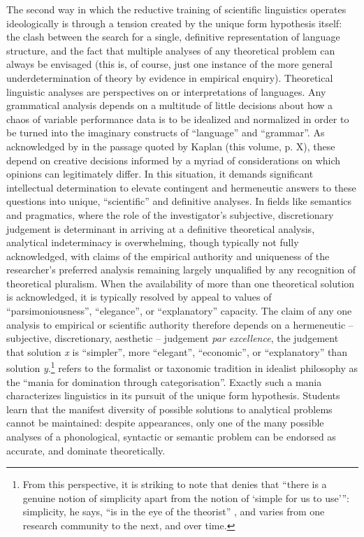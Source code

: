 \documentclass[output=paper]{langscibook}
\begin{document}
The second way in which the reductive training of scientific linguistics operates ideologically is through a tension created by the unique form hypothesis itself: the clash between the search for a single, definitive representation of language structure, and the fact that multiple analyses of any theoretical problem can always be envisaged (this is, of course, just one instance of the more general underdetermination of theory by evidence in empirical enquiry). Theoretical linguistic analyses are perspectives on or interpretations of languages. Any grammatical analysis depends on a multitude of little decisions about how a chaos of variable performance data is to be idealized and normalized in order to be turned into the imaginary constructs of ``language'' and ``grammar''. As acknowledged by \citet[147]{Hockett1958} in the passage quoted by Kaplan (this volume, p. X), these depend on creative decisions informed by a myriad of considerations on which opinions can legitimately differ. In this situation, it demands significant intellectual determination to elevate contingent and hermeneutic answers to these questions into unique, ``scientific'' and definitive analyses. In fields like semantics and pragmatics, where the role of the investigator's subjective, discretionary judgement is determinant in arriving at a definitive theoretical analysis, analytical indeterminacy is overwhelming, though typically not fully acknowledged, with claims of the empirical authority and uniqueness of the researcher's preferred analysis remaining largely unqualified by any recognition of theoretical pluralism. When the availability of more than one theoretical solution is acknowledged, it is typically resolved by appeal to values of ``parsimoniousness'', ``elegance'', or ``explanatory'' capacity. The claim of any one analysis to empirical or scientific authority therefore depends on a hermeneutic – subjective, discretionary, aesthetic – judgement \emph{par excellence}, the judgement that solution \emph{x} is ``simpler'', more ``elegant'', ``economic'', or ``explanatory'' than solution \emph{y}.\footnote{From this perspective, it is striking to note that \citet[159]{Ludlow2011} denies that ``there is a genuine notion of simplicity apart from the notion of `simple for us to use'\thinspace'': simplicity, he says, ``is in the eye of the theorist'' \citep[161]{Ludlow2011}, and varies from one research community to the next, and over time.} \citet[105]{Althusser2015} refers to the formalist or taxonomic tradition in idealist philosophy as the ``mania for domination through categorisation''. Exactly such a mania characterizes linguistics in its pursuit of the unique form hypothesis. Students learn that the manifest diversity of possible solutions to analytical problems cannot be maintained: despite appearances, only one of the many possible analyses of a phonological, syntactic or semantic problem can be endorsed as accurate, and dominate theoretically.
\end{document}
